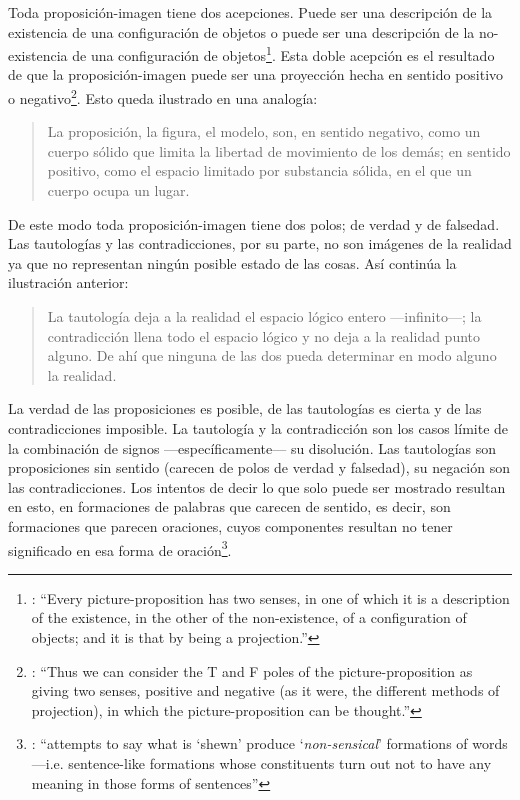 Toda proposición-imagen tiene dos acepciones. Puede ser una descripción de la existencia de una configuración de objetos o puede ser una descripción de la no-existencia de una configuración de objetos\footnote{\cite[Cf.~][72]{anscombe1959iwt}: \enquote{Every picture-proposition has two senses, in one of which it is a description of the existence, in the other of the non-existence, of a configuration of objects; and it is that by being a projection.}}. Esta doble acepción es el resultado de que la proposición-imagen puede ser una proyección hecha en sentido positivo o negativo\footnote{\cite[Cf.~][74]{anscombe1959iwt}: \enquote{Thus we can consider the T and F poles of the picture-proposition as giving two senses, positive and negative (as it were, the different methods of projection), in which the picture-proposition can be thought.}}. Esto queda ilustrado en una analogía: \blockquote[{\cite[\S4.463]{wittgenstein1922tractatuses}}]{La proposición, la figura, el modelo, son, en sentido negativo, como un cuerpo sólido que limita la libertad de movimiento de los demás; en sentido positivo, como el espacio limitado por substancia sólida, en el que un cuerpo ocupa un lugar.}

De este modo toda proposición-imagen tiene dos polos; de verdad y de falsedad. Las tautologías y las contradicciones, por su parte, no son imágenes de la realidad ya que no representan ningún posible estado de las cosas. Así continúa la ilustración anterior:
\blockquote[{\cite[\S4.463]{wittgenstein1922tractatuses}}]{La tautología deja a la realidad el espacio lógico entero ---infinito---; la contradicción llena todo el espacio lógico y no deja a la realidad punto alguno. De ahí que ninguna de las dos pueda determinar en modo alguno la realidad.}

La verdad de las proposiciones es posible, de las tautologías es cierta y de las contradicciones imposible. La tautología y la contradicción son los casos límite de la combinación de signos ---específicamente--- su disolución.\autocite[Cf.~][\S4.464 y \S4.466]{wittgenstein1922tractatuses} Las tautologías son proposiciones sin sentido (carecen de polos de verdad y falsedad), su negación son las contradicciones. Los intentos de decir lo que solo puede ser mostrado resultan en esto, en formaciones de palabras que carecen de sentido, es decir, son formaciones que parecen oraciones, cuyos componentes resultan no tener significado en esa forma de oración\footnote{\cite[Cf.~][163]{anscombe1959iwt}: \enquote{attempts to say what is `shewn' produce `\emph{non-sensical}' formations of words---i.e. sentence-like formations whose constituents turn out not to have any meaning in those forms of sentences}}.

